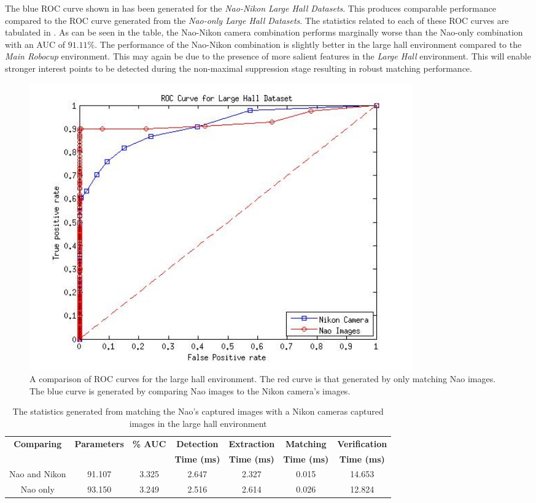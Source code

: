 \documentclass[11pt]{report}
\begin{document}
The blue ROC curve shown in  has been generated for the \textit{Nao-Nikon Large Hall Datasets}. This produces comparable performance compared to the ROC curve generated from the \textit{Nao-only Large Hall Datasets}. The statistics related to each of these ROC curves are tabulated in . As can be seen in the table, the Nao-Nikon camera combination performs marginally worse than the Nao-only combination with an AUC of $91.11\%$. The performance of the Nao-Nikon combination is slightly better in the large hall environment compared to the \textit{Main Robocup} environment. This may again be due to the presence of more salient features in the \textit{Large Hall} environment. This will enable stronger interest points to be detected during the non-maximal suppression stage resulting in robust matching performance.\\ 


 \begin{figure}[h!] 
  \centering
    \includegraphics[width=0.8\textwidth]{../Drawings/camera/ROC_dataset3.jpg}
    \caption{A comparison of ROC curves for the large hall environment. The red curve is that generated by only matching Nao images. The blue curve is generated by comparing Nao images to the Nikon camera's images. }
    \label{fig:rocLargeHallNikon}
\end{figure}

\begin{table}
\centering
\caption{The statistics generated from matching the Nao's captured images with
a Nikon cameras captured images in the large hall environment}
\footnotesize
\begin{tabular}{|c|c|c|c|c|c|c|}
\hline 
\textbf{Comparing} & \textbf{Parameters} & \textbf{\% AUC} & \textbf{Detection} & \textbf{Extraction} & \textbf{Matching} & \textbf{Verification}\tabularnewline
 &  &  & \textbf{Time (ms)} & \textbf{Time (ms)} & \textbf{Time (ms)} & \textbf{Time (ms)}\tabularnewline
\hline 
\hline 
Nao and Nikon & 91.107 & 3.325 & 2.647 & 2.327 & 0.015 & 14.653\tabularnewline
\hline 
Nao only & 93.150 & 3.249 & 2.516 & 2.614 & 0.026 & 12.824\tabularnewline
\hline 
\end{tabular}
\label{tab:naoNikonLargeHall}
\end{table}
\end{document}
